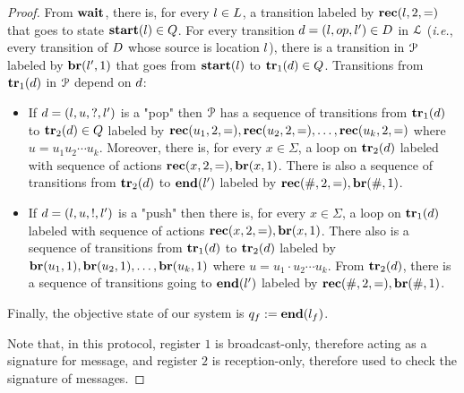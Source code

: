 \begin{proof}
	From $\mathbf{wait}$, there is, for every $l \in L$, a transition labeled by $\textbf{rec}(l, 2, {=})$ that goes to state $\mathbf{start}(l) \in Q$. 
	For every transition $\ltrans = (\lstate, \op, \lstate') \in \ltransitions$ in $\mathcal{L}$ (\emph{i.e.}, every transition of $D$ whose source is location $l$), there is a transition in $\mathcal{P}$ labeled by $\br{\mathsf{\lstate'}}{1}$ that goes from $\mathbf{start}(l)$ to $\mathbf{tr}_1(d) \in Q$. 
	Transitions from $\mathbf{tr}_1(d)$ in $\mathcal{P}$ depend on $d$:
	\begin{itemize}
		\item If $d=(l, u,?, l')$ is a "pop" then $\mathcal{P}$ has a sequence of transitions from $\mathbf{tr}_1(d)$ to $\mathbf{tr}_2(d) \in Q$ labeled by $\rec{\mathsf{u_1}}{2}{\eqtestact}, \rec{\mathsf{u_2}}{2}{\eqtestact}, \dots, \rec{\mathsf{u_k}}{2}{\eqtestact}$ where $u = u_1 u_2 \cdots u_k$. Moreover, there is, for every $x \in \Sigma$, a loop on $\mathbf{tr}_2(d)$ labeled with sequence of actions $\rec{\mathsf{x}}{2}{\eqtestact}, \br{\mathsf{x}}{1}$. There is also a sequence of  transitions from $\mathbf{tr}_2(d)$ to $\mathbf{end}(l')$ labeled by $\rec{\mathsf{\#}}{2}{\eqtestact}, \br{\mathsf{\#}}{1}$.
		\item If $d= (l, u,!, l')$ is a "push" then there is, for every $x \in \Sigma$, a loop on $\mathbf{tr}_1(d)$ labeled with sequence of actions $\rec{\mathsf{x}}{2}{\eqtestact}, \br{\mathsf{x}}{1}$. There also is a sequence of transitions from $\mathbf{tr}_1(d)$ to $\mathbf{tr}_2(d)$ labeled by $\br{\mathsf{u_1}}{1}, \br{\mathsf{u_2}}{1}, \dots, \br{\mathsf{u_k}}{1}$ where $u = u_1 \cdot u_2 \cdots u_k$. From $\mathbf{tr}_2(d)$, there is  a sequence of transitions going to $\mathbf{end}(l')$ labeled by $\rec{\mathsf{\#}}{2}{\eqtestact}, \br{\mathsf{\#}}{1}$.
	\end{itemize}
	Finally, the objective state of our system is $q_f := \mathbf{end}(l_f)$.
	
	Note that, in this protocol, register $1$ is broadcast-only, therefore acting as a signature for message, and register $2$ is reception-only, therefore used to check the signature of messages.
	

\end{proof}
